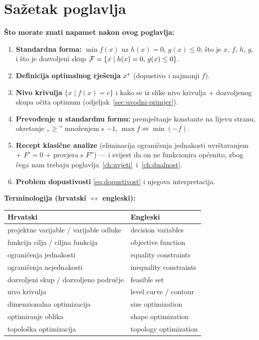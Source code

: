 \section{Sažetak poglavlja}

\textbf{Što morate znati napamet nakon ovog poglavlja:}

\begin{enumerate}
  \item \textbf{Standardna forma:} $\min f(x)$ uz $h(x) = 0$, $g(x) \le 0$; što
        je $x$, $f$, $h$, $g$, i što je dozvoljeni skup
        $\mathcal{F} = \{x \mid h(x)=0,\, g(x)\le 0\}$.
  \item \textbf{Definicija optimalnog rješenja} $x^{\star}$ (dopustivo \emph{i}
        najmanji $f$).
  \item \textbf{Nivo krivulja} $\{x \mid f(x) = c\}$ i kako se iz slike nivo
        krivulja $+$ dozvoljenog skupa očita optimum
        (odjeljak~\ref{sec:uvodni-primjer}).
  \item \textbf{Prevođenje u standardnu formu:} premještanje konstante na lijevu
        stranu, okretanje „$\ge$” množenjem s $-1$,
        $\max f \Leftrightarrow \min(-f)$.
  \item \textbf{Recept klasične analize} (eliminacija ograničenja jednakosti
        uvrštavanjem $+$ $F' = 0$ $+$ provjera s $F''$) --- i svijest da on ne
        funkcionira općenito, zbog čega nam trebaju
        poglavlja~\ref{ch:uvjeti}~i~\ref{ch:dualnost}.
  \item \textbf{Problem dopustivosti} \eqref{eq:dopustivost} i njegova
        interpretacija.
\end{enumerate}

\textbf{Terminologija (hrvatski $\leftrightarrow$ engleski):}

\begin{center}
\begin{tabular}{ll}
\toprule
\textbf{Hrvatski} & \textbf{Engleski} \\
\midrule
projektne varijable / varijable odluke & decision variables \\
funkcija cilja / ciljna funkcija & objective function \\
ograničenja jednakosti & equality constraints \\
ograničenja nejednakosti & inequality constraints \\
dozvoljeni skup / dozvoljeno područje & feasible set \\
nivo krivulja & level curve / contour \\
dimenzionalna optimizacija & size optimization \\
optimiranje oblika & shape optimization \\
topološka optimizacija & topology optimization \\
\bottomrule
\end{tabular}
\end{center}
